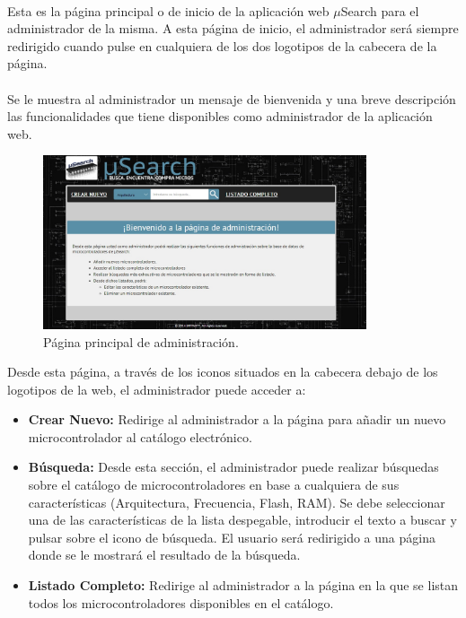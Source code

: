 \paragraph{}Esta es la página principal o de inicio de la aplicación web $\mu$Search para el administrador de la misma. A esta página de inicio, el administrador será siempre redirigido cuando pulse en cualquiera de los dos logotipos de la cabecera de la página.

\paragraph{}Se le muestra al administrador un mensaje de bienvenida y una breve descripción las funcionalidades que tiene disponibles como administrador de la aplicación web.

\begin{figure}[h!]
	\centering
	\includegraphics[width=0.85\textwidth]{img/principal_admin}
	\caption{Página principal de administración.}
	\label{fig:principal_admin}
\end{figure}

Desde esta página, a través de los iconos situados en la cabecera debajo de los logotipos de la web, el administrador puede acceder a:
\begin{itemize}
	
	\item \textbf{Crear Nuevo:} Redirige al administrador a la página para añadir un nuevo microcontrolador al catálogo electrónico.
	
	\item \textbf{Búsqueda:} Desde esta sección, el administrador puede realizar búsquedas sobre el catálogo de microcontroladores en base a cualquiera de sus características (Arquitectura, Frecuencia, Flash, RAM). Se debe seleccionar una de las características de la lista despegable, introducir el texto a buscar y pulsar sobre el icono de búsqueda.
	El usuario será redirigido a una página donde se le mostrará el resultado de la búsqueda.
	
	\item \textbf{Listado Completo:} Redirige al administrador a la página en la que se listan todos los microcontroladores disponibles en el catálogo.
	
\end{itemize}
